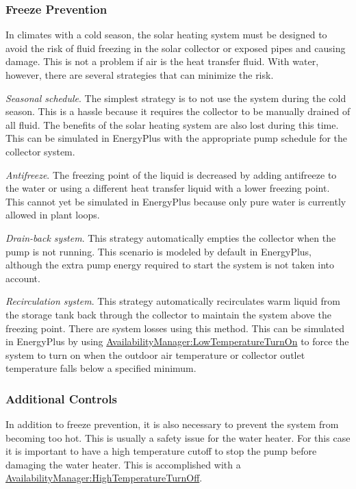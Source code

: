 \subsubsection{Freeze Prevention}\label{freeze-prevention}

In climates with a cold season, the solar heating system must be designed to avoid the risk of fluid freezing in the solar collector or exposed pipes and causing damage. This is not a problem if air is the heat transfer fluid. With water, however, there are several strategies that can minimize the risk.

\emph{Seasonal schedule}. The simplest strategy is to not use the system during the cold season. This is a hassle because it requires the collector to be manually drained of all fluid. The benefits of the solar heating system are also lost during this time. This can be simulated in EnergyPlus with the appropriate pump schedule for the collector system.

\emph{Antifreeze}. The freezing point of the liquid is decreased by adding antifreeze to the water or using a different heat transfer liquid with a lower freezing point. This cannot yet be simulated in EnergyPlus because only pure water is currently allowed in plant loops.

\emph{Drain-back system}. This strategy automatically empties the collector when the pump is not running. This scenario is modeled by default in EnergyPlus, although the extra pump energy required to start the system is not taken into account.

\emph{Recirculation system}. This strategy automatically recirculates warm liquid from the storage tank back through the collector to maintain the system above the freezing point. There are system losses using this method. This can be simulated in EnergyPlus by using \hyperref[availabilitymanagerlowtemperatureturnon]{AvailabilityManager:LowTemperatureTurnOn} to force the system to turn on when the outdoor air temperature or collector outlet temperature falls below a specified minimum.

\subsubsection{Additional Controls}\label{additional-controls}

In addition to freeze prevention, it is also necessary to prevent the system from becoming too hot. This is usually a safety issue for the water heater. For this case it is important to have a high temperature cutoff to stop the pump before damaging the water heater. This is accomplished with a \hyperref[availabilitymanagerhightemperatureturnoff]{AvailabilityManager:HighTemperatureTurnOff}.

